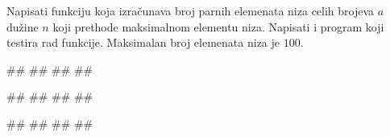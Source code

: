 \begin{Exercise}[label=p.broj_manjih_od_maksimuma] 
 Napisati funkciju  koja
 izračunava broj parnih elemenata niza celih brojeva $a$ dužine $n$
 koji prethode maksimalnom elementu niza. Napisati i program koji
 testira rad funkcije. Maksimalan broj elemenata niza je $100$.
 
\begin{miditest}
\begin{upotreba}{1}
#\naslovInt#
##
##
##
\end{upotreba}
\end{miditest}
\begin{miditest}
\begin{upotreba}{2}
#\naslovInt#
##
##
##
\end{upotreba}
\end{miditest}

\begin{miditest}
\begin{upotreba}{3}
#\naslovInt#
##
##
##
\end{upotreba}
\end{miditest}

\end{Exercise}

\ifresenja
\begin{Answer}[ref=p.broj_manjih_od_maksimuma]
\end{Answer}
\fi

